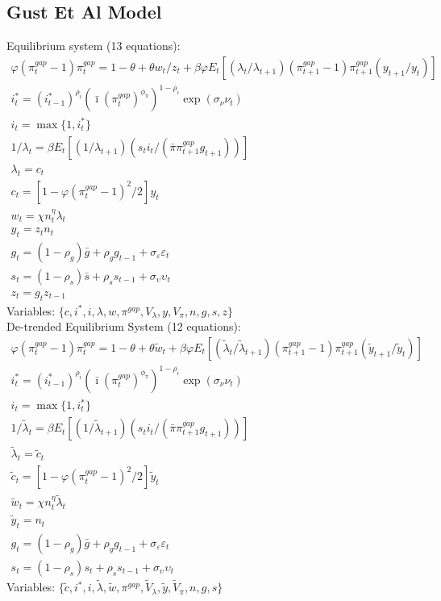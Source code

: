 \documentclass[12pt, final]{article}
\begin{document}
\subsection{Gust Et Al Model}
\noindent Equilibrium system (13 equations):
\small\begin{gather}
\varphi(\pi_t^{gap}-1)\pi_t^{gap} = 1-\theta + \theta w_t/z_t + \beta\varphi E_t[(\lambda_t/\lambda_{t+1})(\pi_{t+1}^{gap}-1)\pi_{t+1}^{gap}(y_{t+1}/y_t)]\\
i_t^*=(i^*_{t-1})^{\rho_i}(\bar{\imath}(\pi^{gap}_t)^{\phi_\pi})^{1-\rho_i}\exp(\sigma_\nu\nu_t)\\
i_t=\max\{1,i_t^*\}\\
1/\lambda_t =  \beta E_t[(1/\lambda_{t+1})(s_ti_t/(\bar{\pi}\pi_{t+1}^{gap}g_{t+1}))]\\
\lambda_t = c_t \\
c_t = [1-\varphi(\pi_t^{gap}-1)^2/2]y_t\\
w_t = \chi n_t^\eta \lambda_t\\
  y_t=z_t n_t\\  
  g_t= (1-\rho_g)\bar{g}+\rho_gg_{t-1} + \sigma_\varepsilon\varepsilon_t \\
  s_t=(1-\rho_s)\bar{s}+\rho_ss_{t-1} + \sigma_\upsilon\upsilon_t\\
  z_t=g_tz_{t-1}
\end{gather}\normalsize
Variables: $\{c,i^*,i,\lambda,w,\pi^{gap},V_{\lambda},y,V_{\pi},n,g,s,z\}$\\

\setcounter{equation}{0}
\noindent De-trended Equilibrium System (12 equations):
\small\begin{gather}
\varphi(\pi_t^{gap}-1){\pi}_t^{gap} = 1 - \theta + \theta\tilde{w}_t + \beta\varphi E_t[(\tilde{\lambda}_t/\tilde{\lambda}_{t+1})(\pi^{gap}_{t+1}-1)\pi^{gap}_{t+1}(\tilde{y}_{t+1}/\tilde{y}_t)]\\
i_t^*=(i^*_{t-1})^{\rho_i}(\bar{\imath}(\pi_t^{gap})^{\phi_\pi})^{1-\rho_i}\exp(\sigma_\nu\nu_t)\\
i_t=\max\{1,i_t^*\}\\
1/\tilde{\lambda}_t = \beta E_t[(1/\tilde{\lambda}_{t+1})(s_ti_t/(\bar{\pi}\pi^{gap}_{t+1}g_{t+1}))]\\%
\tilde{\lambda}_t = \tilde{c}_t\\
\tilde{c}_t = [1-\varphi(\pi_t^{gap} - 1)^2/2]\tilde{y}_t\\
\tilde{w}_t = \chi n_t^\eta \tilde{\lambda}_t  \\
  \tilde{y}_t= n_t\\  
  g_t= (1-\rho_g)\bar{g}+\rho_gg_{t-1} + \sigma_\varepsilon\varepsilon_t \\
  s_t=(1-\rho_s)s_t+\rho_ss_{t-1} + \sigma_\upsilon\upsilon_t
\end{gather}
Variables: $\{\tilde{c},i^*,i,\tilde{\lambda},\tilde{w},\pi^{gap},\tilde{V}_{\lambda},\tilde{y},\tilde{V}_{\pi},n,g,s\}$\\ 
\end{document}
